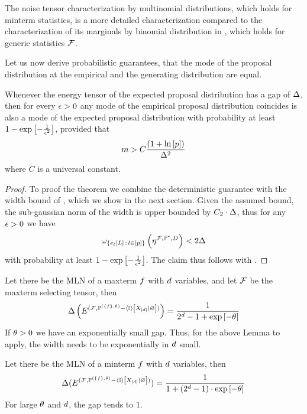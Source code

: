 The noise tensor characterization by multinomial distributions, which holds for minterm statistics, is a more detailed characterization compared to the characterization of its marginals by binomial distribution in , which holds for generic statistics $\mathcal{F}$.


Let us now derive probabilistic guarantees, that the mode of the proposal distribution at the empirical and the generating distribution are equal.

\begin{theorem}
    \label{the:probGuaranteeProposalDist}
    Whenever the energy tensor of the expected proposal distribution has a gap of $\Delta$, then for every $\epsilon>0$ any mode of the empirical proposal distribution coincides is also a mode of the expected proposal distribution with probability at least $1-\mathrm{exp}\left[-\frac{1}{\epsilon^2}\right]$, provided that
    \begin{align*}
        m > C\frac{(1+\ln \left[ p \right])}{\Delta^2}
    \end{align*}
    where $C$ is a universal constant.
\end{theorem}
\begin{proof}
    To proof the theorem we combine the deterministic guarantee  with the width bound of , which we show in the next section.
    Given the assumed bound, the sub-gaussian norm of the width is upper bounded by $C_2\cdot \Delta$, thus for any $\epsilon>0$ we have
    \begin{align*}
        \omega_{\{e_{l}\left[L\right] \,:\, l\in[p] \}}\left(\eta^{\mathcal{F},\mathbb{P}^*,D}\right)  < 2 \Delta
    \end{align*}
    with probability at least $1-\mathrm{exp}\left[-\frac{1}{\epsilon^2}\right]$.
    The claim thus follows with .
\end{proof}


\begin{example}
    Let there be the MLN of a maxterm $f$ with $d$ variables, and let $\mathcal{F}$ be the maxterm selecting tensor, then
    \[ \Delta\left(
    E^{(\mathcal{F}, \mathbb{P}^{(\{f\},\theta)} - \left\langle \mathbb{I}\right\rangle \left[ X_{[d]} | \varnothing \right] )}
    \right) = \frac{1}{2^{d}-1 + \mathrm{exp}\left[-\theta\right]}  \]
    If $\theta>0$ we have an exponentially small gap.
    Thus, for the above Lemma to apply, the width needs to be exponentially in $d$ small.


    Let there be the MLN of a minterm $f$ with $d$ variables, then
    \[ \Delta(
    E^{(\mathcal{F}, \mathbb{P}^{(\{f\},\theta)} - \left\langle \mathbb{I}\right\rangle \left[ X_{[d]} | \varnothing \right] )}
    ) = \frac{1}{1+(2^{d}-1)\cdot\mathrm{exp}\left[-\theta\right]}  \]
    For large $\theta$ and $d$, the gap tends to $1$.
\end{example}

